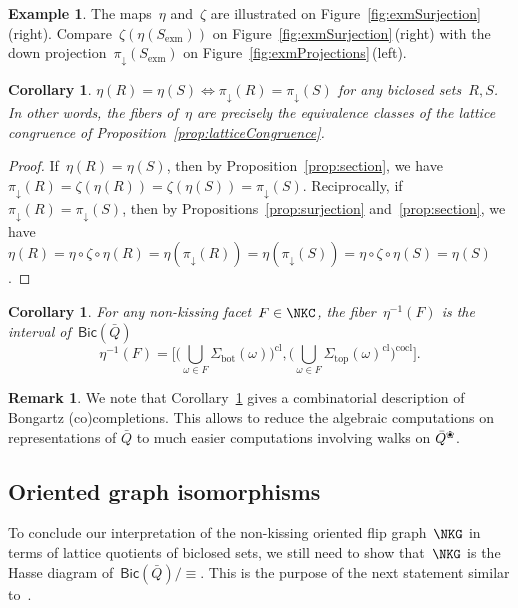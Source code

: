 \documentclass{amsart}
\newtheorem{corollary}[theorem]{Corollary}
\theoremstyle{definition}
\newtheorem{example}[theorem]{Example}
\newtheorem{remark}[theorem]{Remark}
\newcommand{\fref}[1]{Figure~\ref{#1}} %
\newcommand{\ex}{_{\textrm{exm}}} %
\newcommand{\blossom}{^\text{\ding{96}}} %
\renewcommand{\top}{\mathrm{top}} %
\newcommand{\bottom}{\mathrm{bot}} %
\newcommand{\closure}[1]{#1^{\mathrm{cl}}} %
\newcommand{\coclosure}[1]{#1^{\mathrm{cocl}}} %
\newcommand{\Bicl}[1]{\mathsf{Bic}(#1)} %
\newcommand{\projDown}{\pi_\downarrow} %
\begin{document}
\begin{example}
The maps~$\eta$ and~$\zeta$ are illustrated on \fref{fig:exmSurjection}\,(right).
Compare~$\zeta(\eta(S\ex))$ on \fref{fig:exmSurjection}\,(right) with the down projection~$\projDown(S\ex)$ on \fref{fig:exmProjections}\,(left).
\end{example}

\begin{corollary}
\label{coro:fibers}
$\eta(R) = \eta(S) \iff \projDown(R) = \projDown(S)$ for any biclosed sets~$R,S$. In other words, the fibers of~$\eta$ are precisely the equivalence classes of the lattice congruence of Proposition~\ref{prop:latticeCongruence}.
\end{corollary}

\begin{proof}
If~$\eta(R) = \eta(S)$, then by Proposition~\ref{prop:section}, we have~$\projDown(R) = \zeta(\eta(R)) = \zeta(\eta(S)) = \projDown(S)$.
Reciprocally, if~$\projDown(R) = \projDown(S)$, then by Propositions~\ref{prop:surjection} and~\ref{prop:section}, we have~$\eta(R) = \eta \circ \zeta \circ \eta(R) = \eta(\projDown(R)) = \eta(\projDown(S)) = \eta \circ \zeta \circ \eta(S) = \eta(S)$.
\end{proof}

\begin{corollary}\label{cor: interval biclosed}
For any non-kissing facet~$F \in \NKC$, the fiber~$\eta^{-1}(F)$ is the interval of~$\Bicl{\bar Q}$
\[
\eta^{-1}(F) = \bigg[ \closure{ \Big( \bigcup_{\omega \in F} \Sigma_\bottom(\omega) \Big) }, \coclosure{ \Big( \bigcup_{\omega \in F} \closure{\Sigma_\top(\omega)} \Big) } \bigg].
\]
\end{corollary}

\begin{remark}\label{rem: Bongartz}
 We note that Corollary~\ref{cor: interval biclosed} gives a combinatorial description of Bongartz (co)com\-pletions.
 This allows to reduce the algebraic computations on representations of $\bar Q$ to much easier computations involving walks on $\bar Q\blossom$.
\end{remark}


\subsection{Oriented graph isomorphisms}

To conclude our interpretation of the non-kissing oriented flip graph~$\NKG$ in terms of lattice quotients of biclosed sets, we still need to show that~$\NKG$ is the Hasse diagram of~$\Bicl{\bar Q}/{\equiv}$.
This is the purpose of the next statement similar to~\cite[Claim~8.10]{McConville}.
\end{document}
